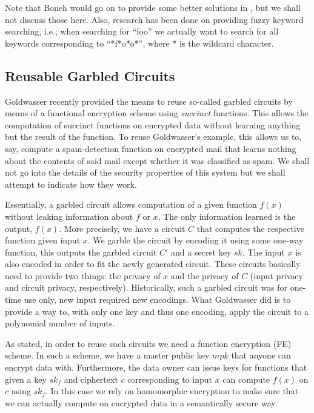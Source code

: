 \documentclass[11pt]{article}
\begin{document}
Note that Boneh would go on to provide some better solutions in \cite{boneh2007public}, but we shall not discuss those here.
Also, research has been done \cite{li2010fuzzy} on providing fuzzy keyword searching, i.e., when searching for ``foo'' we actually want to search for all keywords corresponding to ``*f*o*o*'', where * is the wildcard character.




\subsection{Reusable Garbled Circuits}

Goldwasser \cite{goldwasser2013reusable} recently provided the means to reuse so-called garbled circuits by means of a functional encryption scheme using \emph{succinct} functions.
This allows the computation of succinct functions on encrypted data without learning anything but the result of the function.
To reuse Goldwasser's example, this allows us to, say, compute a spam-detection function on encrypted mail that learns nothing about the contents of said mail except whether it was classified as spam.
We shall not go into the details of the security properties of this system but we shall attempt to indicate how they work.

Essentially, a garbled circuit allows computation of a given function $f(x)$ without leaking information about $f$ or $x$.
The only information learned is the output, $f(x)$.
More precisely, we have a circuit $C$ that computes the respective function given input $x$.
We garble the circuit by encoding it using some one-way function, this outputs the garbled circuit $C'$ and a secret key $sk$.
The input $x$ is also encoded in order to fit the newly generated circuit.
These circuits basically need to provide two things: the privacy of $x$ and the privacy of $C$ (input privacy and circuit privacy, respectively).
Historically, such a garbled circuit was for one-time use only, new input required new encodings.
What Goldwasser did is to provide a way to, with only one key and thus one encoding, apply the circuit to a polynomial number of inputs.

As stated, in order to reuse such circuits we need a function encryption (FE) scheme.
In such a scheme, we have a master public key $mpk$ that anyone can encrypt data with.
Furthermore, the data owner can issue keys for functions that given a key $sk_f$ and ciphertext $c$ corresponding to input $x$ can compute $f(x)$ on $c$ using $sk_f$.
In this case we rely on homomorphic encryption to make sure that we can actually compute on encrypted data in a semantically secure way.
\end{document}
